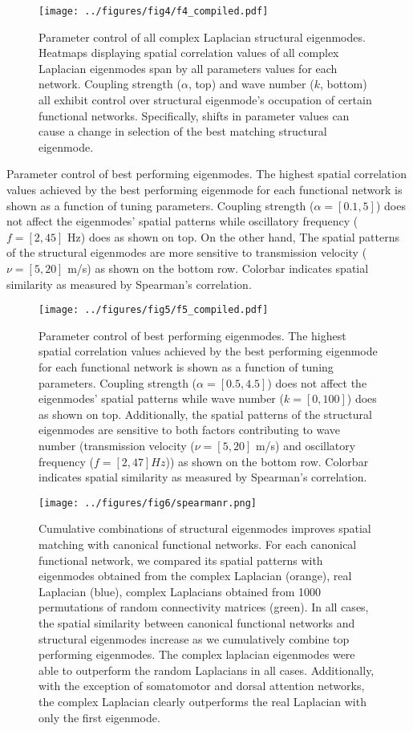 \documentclass{article}
\begin{document}
\begin{figure}[ht]
\centering
\texttt{[image: ../figures/fig4/f4\_compiled.pdf]}
\caption{Parameter control of all complex Laplacian structural eigenmodes. Heatmaps displaying spatial correlation values of all complex Laplacian eigenmodes span by all parameters values for each network. Coupling strength ($\alpha$, top) and wave number ($k$, bottom) all exhibit control over structural eigenmode's occupation of certain functional networks. Specifically, shifts in parameter values can cause a change in selection of the best matching structural eigenmode.}
\label{fig:fig4}
\end{figure}

\caption{Parameter control of best performing eigenmodes. The highest spatial correlation values achieved by the best performing eigenmode for each functional network is shown as a function of tuning parameters. Coupling strength ($\alpha = [0.1, 5]$) does not affect the eigenmodes' spatial patterns while oscillatory frequency ($f = [2, 45]$ Hz) does as shown on top. On the other hand, The spatial patterns of the structural eigenmodes are more sensitive to transmission velocity ($\nu = [5, 20]$ m/s) as shown on the bottom row. Colorbar indicates spatial similarity as measured by Spearman's correlation.}

\begin{figure}[ht]
\centering
\texttt{[image: ../figures/fig5/f5\_compiled.pdf]}
\caption{Parameter control of best performing eigenmodes. The highest spatial correlation values achieved by the best performing eigenmode for each functional network is shown as a function of tuning parameters. Coupling strength ($\alpha = [0.5, 4.5]$) does not affect the eigenmodes' spatial patterns while wave number ($k = [0, 100]$) does as shown on top. Additionally, the spatial patterns of the structural eigenmodes are sensitive to both factors contributing to wave number (transmission velocity ($\nu = [5, 20]$ m/s) and oscillatory frequency ($f = [2, 47]Hz$)) as shown on the bottom row. Colorbar indicates spatial similarity as measured by Spearman's correlation.}
\label{fig:fig5}
\end{figure}

\begin{figure}[ht]
\centering
\texttt{[image: ../figures/fig6/spearmanr.png]}
\caption{Cumulative combinations of structural eigenmodes improves spatial matching with canonical functional networks. For each canonical functional network, we compared its spatial patterns with eigenmodes obtained from the complex Laplacian (orange), real Laplacian (blue), complex Laplacians obtained from 1000 permutations of random connectivity matrices (green). In all cases, the spatial similarity between canonical functional networks and structural eigenmodes increase as we cumulatively combine top performing eigenmodes. The complex laplacian eigenmodes were able to outperform the random Laplacians in all cases. Additionally, with the exception of somatomotor and dorsal attention networks, the complex Laplacian clearly outperforms the real Laplacian with only the first eigenmode.}
\label{fig:fig6}
\end{figure}
\end{document}
